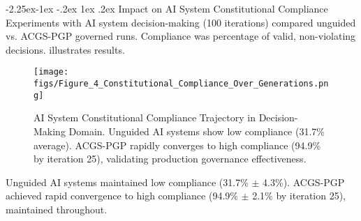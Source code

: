 \documentclass[manuscript,screen,9pt]{acmart}
\makeatletter
\renewcommand\subsection{\@startsection{subsection}{2}{\z@}%
  {-2.25ex\@plus -1ex \@minus -.2ex}%
  {1ex \@plus .2ex}%
  {\normalfont\large\bfseries}}
\makeatother
\begin{document}
\subsection{Impact on AI System Constitutional Compliance}
\label{subsec:impact_compliance}
Experiments with AI system decision-making (100 iterations) compared unguided vs. ACGS-PGP governed runs. Compliance was percentage of valid, non-violating decisions.  illustrates results.
\FloatBarrier %
\begin{figure}[!htb]
\centering
\texttt{[image: figs/Figure\_4\_Constitutional\_Compliance\_Over\_Generations.png]}
\caption[AI System Constitutional Compliance Trajectory]{AI System Constitutional Compliance Trajectory in Decision-Making Domain. Unguided AI systems show low compliance (31.7\% average). ACGS-PGP rapidly converges to high compliance (94.9\% by iteration 25), validating production governance effectiveness.}
\label{fig:compliance_over_generations}
\end{figure}
Unguided AI systems maintained low compliance (31.7\% $\pm$ 4.3\%). ACGS-PGP achieved rapid convergence to high compliance (94.9\% $\pm$ 2.1\% by iteration 25), maintained throughout.
\end{document}
